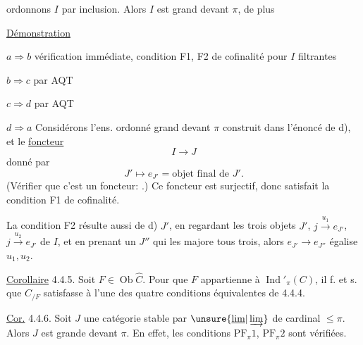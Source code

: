 
ordonnons $I$ par inclusion. Alors $I$ est grand devant $\pi$, de plus   

\uline{Démonstration}

$a\Longrightarrow b$ vérification immédiate,    condition F1, F2 de cofinalité pour  $I$ filtrantes

$b\Longrightarrow c$ par AQT

$c\Longrightarrow d$ par AQT

$d\Longrightarrow a$ Considérons l'ens. ordonné grand devant $\pi$ construit dans l'énoncé de d), et le \uline{foncteur}
\[
I\longrightarrow J
\]
donné par
\[
J'\longmapsto e_{J'}=\text{objet final de }J'.
\]
(Vérifier que c'est un foncteur: .) Ce foncteur est surjectif, donc satisfait la condition F1 de cofinalité.

La condition F2 résulte aussi de d)
$J'$, en regardant les trois objets $J'$, $j\xrightarrow{u_1}e_{J'}$, $j\xrightarrow{u_2}e_{J'}$ de $I$, et en prenant un $J''$ qui les majore tous trois, alors $e_{J'}\longrightarrow e_{J''}$ égalise $u_1,u_2$.


\uline{Corollaire} 4.4.5. Soit $F\in\operatorname{Ob}\widehat C$. Pour que $F$ appartienne à $\operatorname{Ind}'_{\pi}(C)$, il f. et s. que $C_{/F}$ satisfasse à l'une des quatre conditions équivalentes de 4.4.4.
\margin{$\big|$}

\uline{Cor.} 4.4.6. Soit $J$ une catégorie stable par $\unsure{\underline{\lim}|\varinjlim}$ de  cardinal $\leq\pi$. Alors $J$ est grande devant $\pi$. En effet, les conditions $\mathrm{PF}_{\pi}1$, $\mathrm{PF}_{\pi}2$ sont  vérifiées.
